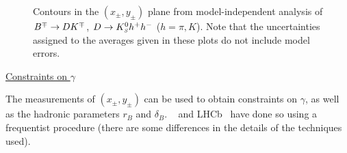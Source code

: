 

\begin{figure}[htbp]
  \begin{center}
  \end{center}
  \vspace{-0.5cm}
  \caption{
    Contours in the $(x_\pm, y_\pm)$ plane from model-independent analysis of $B^\mp \to DK^\mp$, $D \to K^0_{\scriptscriptstyle S} h^+ h^-$ ($h = \pi,K$).
    Note that the uncertainties assigned to the averages given in these plots
    do not include model errors.        
  }
  \label{fig:cp_uta:cus:dalitz-modInd_2d}
\end{figure}

\vspace{3ex}

\noindent
\underline{Constraints on $\gamma$}

The measurements of $(x_\pm, y_\pm)$ can be used to obtain constraints on 
$\gamma$, as well as the hadronic parameters $r_B$ and $\delta_B$.
\belle~\cite{Aihara:2012aw} and LHCb~\cite{Aaij:2012hu,Aaij:2014uva}
have done so using a frequentist procedure (there are some differences in the details of the techniques used).

